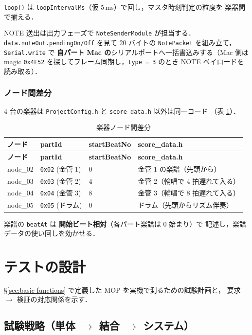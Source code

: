 \documentclass[lualatex,book,paper=a4paper,jafontsize=11.5pt,jafontscale=1.05]{jlreq}
\begin{document}
\texttt{loop()} は \texttt{loopIntervalMs}（仮 5\,ms）で回し，マスタ時刻判定の粒度を
楽器間で揃える．

NOTE 送出は出力フェーズで \texttt{NoteSenderModule} が担当する．
\texttt{data.noteOut.pendingOn/Off} を見て 20 バイトの \texttt{NotePacket} を組み立て，
\texttt{Serial.write} で \textbf{自パート Mac の}シリアルポートへ一括書込みする（Mac 側は magic
\texttt{0x4F52} を探してフレーム同期し，\texttt{type = 3} のとき NOTE ペイロードを読み取る）．

\subsubsection{ノード間差分}

4 台の楽器は \texttt{ProjectConfig.h} と \texttt{score\_data.h} 以外は同一コード
（表 \ref{tab:performer-diff}）．

\begin{longtable}{l l l p{}}
\caption{楽器ノード間差分}\label{tab:performer-diff}\\
\toprule
\textbf{ノード} & \textbf{partId} & \textbf{startBeatNo} & \textbf{score\_data.h} \\
\midrule
\endfirsthead
\toprule
\textbf{ノード} & \textbf{partId} & \textbf{startBeatNo} & \textbf{score\_data.h} \\
\midrule
\endhead
node\_02 & \texttt{0x02} (金管 1) & 0  & 金管 1 の楽譜（先頭から） \\
node\_03 & \texttt{0x03} (金管 2) & 4  & 金管 2（輪唱で 4 拍遅れて入る） \\
node\_04 & \texttt{0x04} (金管 3) & 8  & 金管 3（輪唱で 8 拍遅れて入る） \\
node\_05 & \texttt{0x05} (ドラム) & 0  & ドラム（先頭からリズム伴奏） \\
\bottomrule
\end{longtable}

楽譜の \texttt{beatAt} は \textbf{開始ビート相対}（各パート楽譜は 0 始まり）で
記述し，楽譜データの使い回しを効かせる．


\section{テストの設計}\label{sec:test-design}

\S\ref{sec:basic-functions} で定義した MOP を実機で測るための試験計画と，
要求 $\to$ 検証の対応関係を示す．

\subsection{試験戦略（単体 $\to$ 結合 $\to$ システム）}
\end{document}
